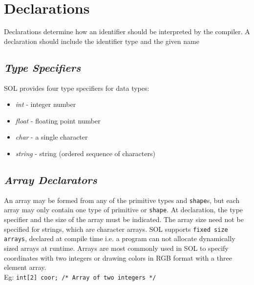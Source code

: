 \section{Declarations}

    Declarations determine how an identifier should be interpreted by the compiler. A declaration should include the identifier type and the given name

    \subsection{\textit{Type Specifiers}} \label{type}
    SOL provides four type specifiers for data types:
    \begin{itemize}
        \itemsep0em
        \item \textit{int} - integer number
        \item \textit{float} - floating point number
        \item \textit{char} - a single character
        \item \textit{string} - string (ordered sequence of characters)
    \end{itemize}

    \subsection{\textit{Array Declarators}} \label{array}
    An array may be formed from any of the primitive types and \texttt{shape}s, but each array may only contain one type of primitive or \texttt{shape}. At declaration, the type specifier and the size of the array must be indicated. The array size need not be specified for strings, which are character arrays. SOL supports \texttt{fixed size arrays}, declared at compile time i.e. a program can not allocate dynamically sized arrays at runtime. Arrays are most commonly used in SOL to specify coordinates with two integers or drawing colors in RGB format with a three element array.\\
    Eg: \texttt{int[2] coor; /* Array of two integers */}


